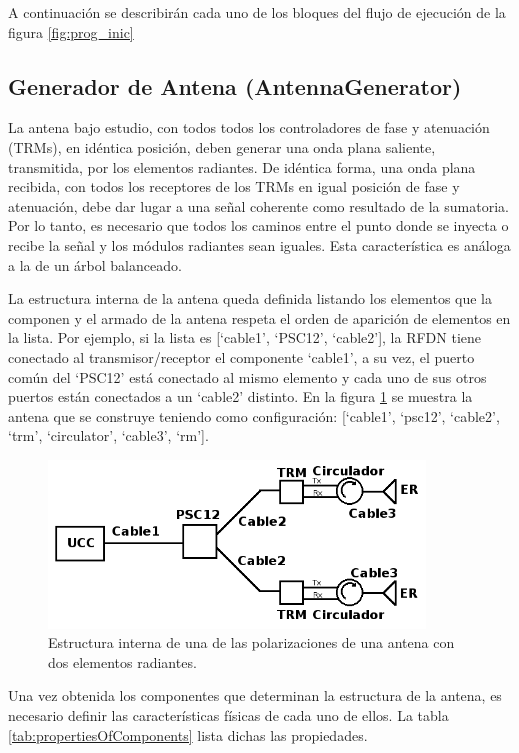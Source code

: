 A continuación se describirán cada uno de los bloques del flujo de ejecución de la figura \ref{fig:prog_inic}

\subsection{Generador de Antena (AntennaGenerator)}

La antena bajo estudio, con todos todos los controladores de fase y atenuación (TRMs), en idéntica posición, deben generar una
onda plana saliente, transmitida, por los elementos radiantes. De idéntica forma, una onda plana recibida, con todos los
receptores de los TRMs en igual posición de fase y atenuación, debe dar lugar a una señal coherente como resultado de la
sumatoria. Por lo tanto, es necesario que todos los caminos entre el punto donde se inyecta o recibe la señal y los módulos 
radiantes sean iguales. Esta característica es análoga a la de un árbol balanceado. 

La estructura interna de la antena queda definida listando los elementos que la componen y el armado de la antena respeta el
orden de aparición de elementos en la lista. Por ejemplo, si la lista es [\enquote*{cable1}, \enquote*{PSC12},
\enquote*{cable2}], la RFDN tiene conectado al transmisor/receptor el componente \enquote*{cable1}, a su vez, el puerto común
del \enquote*{PSC12} está conectado al mismo elemento y cada uno de sus otros puertos están conectados a un \enquote*{cable2}
distinto. En la figura \ref{fig:2RMAntenna} se muestra la antena que se construye teniendo como configuración:
[\enquote*{cable1}, \enquote*{psc12}, \enquote*{cable2}, \enquote*{trm}, \enquote*{circulator}, \enquote*{cable3},
\enquote*{rm}].

\begin{figure}
 \centering
 \includegraphics[width=10cm]{gfx/RFDN.png}
 \caption{Estructura interna de una de las polarizaciones de una antena con dos elementos radiantes.}
 \label{fig:2RMAntenna}
\end{figure}

Una vez obtenida los componentes que determinan la estructura de la antena, es necesario definir las características físicas de
cada uno de ellos. La tabla \ref{tab:propertiesOfComponents} lista dichas las propiedades.

